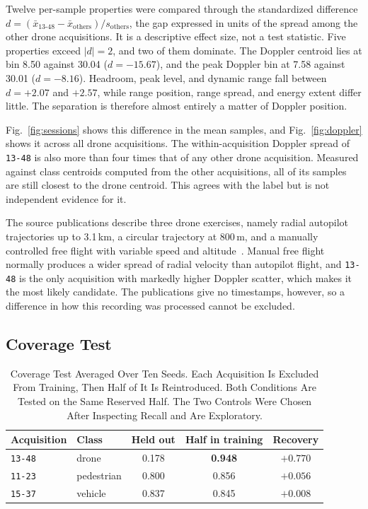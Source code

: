 \documentclass[conference]{IEEEtran}
\begin{document}
Twelve per-sample properties were compared through the standardized difference $d = (\bar{x}_{\mathrm{13\text{-}48}} - \bar{x}_{\mathrm{others}}) / s_{\mathrm{others}}$, the gap expressed in units of the spread among the other drone acquisitions. It is a descriptive effect size, not a test statistic. Five properties exceed $|d|=2$, and two of them dominate. The Doppler centroid lies at bin 8.50 against 30.04 ($d=-15.67$), and the peak Doppler bin at 7.58 against 30.01 ($d=-8.16$). Headroom, peak level, and dynamic range fall between $d=+2.07$ and $+2.57$, while range position, range spread, and energy extent differ little. The separation is therefore almost entirely a matter of Doppler position.

Fig.~\ref{fig:sessions} shows this difference in the mean samples, and Fig.~\ref{fig:doppler} shows it across all drone acquisitions. The within-acquisition Doppler spread of \texttt{13-48} is also more than four times that of any other drone acquisition. Measured against class centroids computed from the other acquisitions, all of its samples are still closest to the drone centroid. This agrees with the label but is not independent evidence for it.

The source publications describe three drone exercises, namely radial autopilot trajectories up to 3.1\,km, a circular trajectory at 800\,m, and a manually controlled free flight with variable speed and altitude~\cite{roldan2020,quevedo2019}. Manual free flight normally produces a wider spread of radial velocity than autopilot flight, and \texttt{13-48} is the only acquisition with markedly higher Doppler scatter, which makes it the most likely candidate. The publications give no timestamps, however, so a difference in how this recording was processed cannot be excluded.

\subsection{Coverage Test}
\label{sec:coverage}

\begin{table}[t]
\caption{Coverage Test Averaged Over Ten Seeds. Each Acquisition Is Excluded From Training, Then Half of It Is Reintroduced. Both Conditions Are Tested on the Same Reserved Half. The Two Controls Were Chosen After Inspecting Recall and Are Exploratory.}
\label{tab:coverage}
\centering
\small
\setlength{\tabcolsep}{4pt}
\begin{tabular}{@{}llccc@{}}
\toprule
Acquisition & Class & Held out & Half in training & Recovery \\
\midrule
\texttt{13-48} & drone      & 0.178 & \textbf{0.948} & \textbf{$+0.770$} \\
\texttt{11-23} & pedestrian & 0.800 & 0.856          & $+0.056$ \\
\texttt{15-37} & vehicle    & 0.837 & 0.845          & $+0.008$ \\
\bottomrule
\end{tabular}
\end{table}
\end{document}
